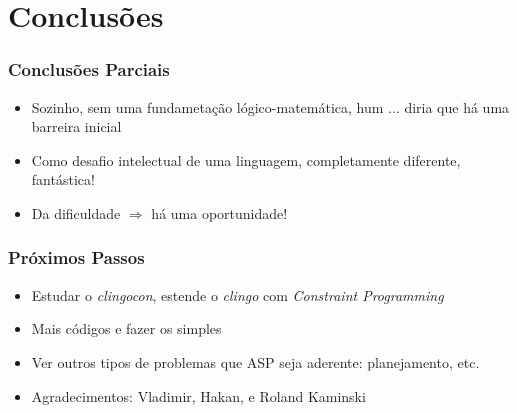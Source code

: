 \documentclass{beamer}
\begin{document}
\section{Conclusões}

\begin{frame}
	\frametitle{Conclusões Parciais}
	
		
\begin{block}{}
	
	\begin{itemize}
		\item Sozinho, sem uma fundametação lógico-matemática, hum ... diria que há uma barreira inicial
		\pause
		
		\item Como desafio intelectual de uma linguagem,
		completamente diferente, fantástica!
		\pause
		
		\item Da dificuldade $\Rightarrow$ há uma oportunidade!
		
		
	\end{itemize}
\end{block}

\end{frame}







\begin{frame} 
	\frametitle{Próximos Passos}
	
\begin{block}{}
	
	\begin{itemize}
		\item Estudar o \emph{clingocon}, estende o \emph{clingo} com \emph{Constraint Programming}

		\item Mais códigos e fazer os simples
		\item Ver outros tipos de problemas que ASP seja aderente: planejamento, etc.
		
		\item Agradecimentos: Vladimir,  Hakan, 	e	Roland Kaminski
		
	\end{itemize}
\end{block}
\end{frame}



\end{document}
